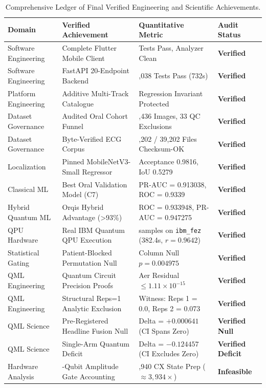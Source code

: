 \documentclass[11pt,a4paper]{report}
\begin{document}
\begin{table}[H]
\centering
\footnotesize
\setlength{\tabcolsep}{3pt}
\begin{tabularx}{\textwidth}{>{\raggedright\arraybackslash}p{2.6cm} >{\raggedright\arraybackslash}X >{\raggedright\arraybackslash}p{4.2cm} >{\raggedright\arraybackslash}p{2.0cm}}
\toprule
\textbf{Domain} & \textbf{Verified Achievement} & \textbf{Quantitative Metric} & \textbf{Audit Status} \\
\midrule
Software Engineering & Complete Flutter Mobile Client & 193 Tests Pass, Analyzer Clean & \textbf{Verified} \\
Software Engineering & FastAPI 20-Endpoint Backend & 1,038 Tests Pass (732s) & \textbf{Verified} \\
Platform Engineering & Additive Multi-Track Catalogue & Regression Invariant Protected & \textbf{Verified} \\
Dataset Governance & Audited Oral Cohort Funnel & 2,436 Images, 33 QC Exclusions & \textbf{Verified} \\
Dataset Governance & Byte-Verified ECG Corpus & 39,202 / 39,202 Files Checksum-OK & \textbf{Verified} \\
Localization & Pinned MobileNetV3-Small Regressor & Acceptance 0.9816, IoU 0.5279 & \textbf{Verified} \\
Classical ML & Best Oral Validation Model (C7) & PR-AUC = 0.913038, ROC = 0.9339 & \textbf{Verified} \\
Hybrid Quantum ML & Orqis Hybrid Advantage (>93\%) & ROC = 0.933948, PR-AUC = 0.947275 & \textbf{Verified} \\
QPU Hardware & Real IBM Quantum QPU Execution & 50 samples on \nolinkurl{ibm_fez} (382.4s, $r=0.9642$) & \textbf{Verified} \\
Statistical Gating & Patient-Blocked Permutation Null & Column Null $p = 0.004975$ & \textbf{Verified} \\
QML Engineering & Quantum Circuit Precision Proofs & Aer Residual $\le 1.11 \times 10^{-15}$ & \textbf{Verified} \\
QML Engineering & Structural Reps=1 Analytic Exclusion & Witness: Reps 1 = 0.0, Reps 2 = 0.073 & \textbf{Verified} \\
QML Science & Pre-Registered Headline Fusion Null & Delta = $+0.000641$ (CI Spans Zero) & \textbf{Verified Null} \\
QML Science & Single-Arm Quantum Deficit & Delta = $-0.124457$ (CI Excludes Zero)& \textbf{Verified Deficit} \\
Hardware Analysis & 16-Qubit Amplitude Gate Accounting & 62,940 CX State Prep ($\approx 3,934\times$) & \textbf{Infeasible} \\
\bottomrule
\end{tabularx}
\caption{Comprehensive Ledger of Final Verified Engineering and Scientific Achievements.}
\label{tab:final_ledger}
\end{table}
\end{document}
